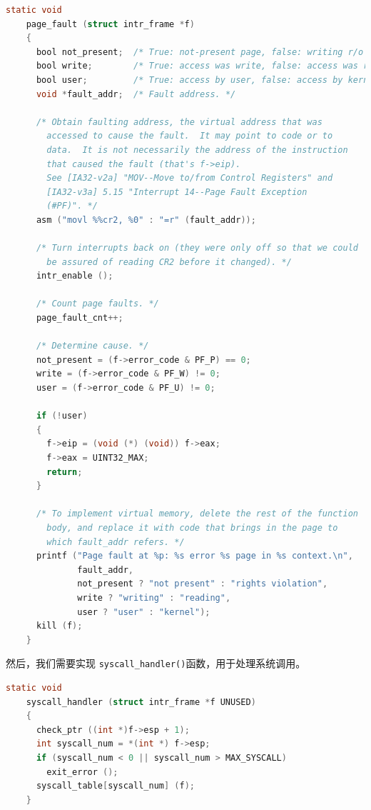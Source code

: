 \documentclass{article}
\begin{document}
\begin{lstlisting}[language=C, title=\texttt{src/userprog/exception.c - page\_fault()}]
    static void
    page_fault (struct intr_frame *f) 
    {
      bool not_present;  /* True: not-present page, false: writing r/o page. */
      bool write;        /* True: access was write, false: access was read. */
      bool user;         /* True: access by user, false: access by kernel. */
      void *fault_addr;  /* Fault address. */
    
      /* Obtain faulting address, the virtual address that was
        accessed to cause the fault.  It may point to code or to
        data.  It is not necessarily the address of the instruction
        that caused the fault (that's f->eip).
        See [IA32-v2a] "MOV--Move to/from Control Registers" and
        [IA32-v3a] 5.15 "Interrupt 14--Page Fault Exception
        (#PF)". */
      asm ("movl %%cr2, %0" : "=r" (fault_addr));
    
      /* Turn interrupts back on (they were only off so that we could
        be assured of reading CR2 before it changed). */
      intr_enable ();
    
      /* Count page faults. */
      page_fault_cnt++;
    
      /* Determine cause. */
      not_present = (f->error_code & PF_P) == 0;
      write = (f->error_code & PF_W) != 0;
      user = (f->error_code & PF_U) != 0;
    
      if (!user)
      {
        f->eip = (void (*) (void)) f->eax;
        f->eax = UINT32_MAX;
        return;
      }
    
      /* To implement virtual memory, delete the rest of the function
        body, and replace it with code that brings in the page to
        which fault_addr refers. */
      printf ("Page fault at %p: %s error %s page in %s context.\n",
              fault_addr,
              not_present ? "not present" : "rights violation",
              write ? "writing" : "reading",
              user ? "user" : "kernel");
      kill (f);
    }
\end{lstlisting}

然后，我们需要实现 \texttt{syscall\_handler()}函数，用于处理系统调用。

\begin{lstlisting}[language=C, title=\texttt{src/userprog/syscall.c - syscall\_handler()}]
    static void
    syscall_handler (struct intr_frame *f UNUSED) 
    {
      check_ptr ((int *)f->esp + 1);
      int syscall_num = *(int *) f->esp;
      if (syscall_num < 0 || syscall_num > MAX_SYSCALL)
        exit_error ();
      syscall_table[syscall_num] (f);
    }
\end{lstlisting}
\end{document}

